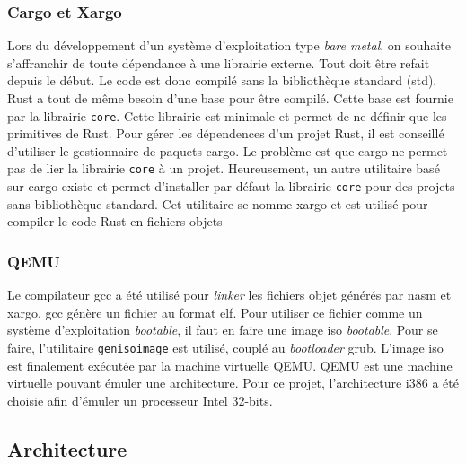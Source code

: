 \subsubsection{Cargo et Xargo}
Lors du développement d'un système d'exploitation type \textit{bare metal}, on souhaite
s'affranchir de toute dépendance à une librairie externe. Tout doit être refait depuis
le début. Le code est donc compilé sans la bibliothèque standard (std). Rust a tout
de même besoin d'une base pour être compilé. Cette base est fournie par la librairie
\texttt{core}. Cette librairie est minimale et permet de ne définir que
les primitives de Rust. Pour gérer les dépendences d'un projet Rust, il est conseillé
d'utiliser le gestionnaire de paquets cargo. Le problème est que cargo ne permet
pas de lier la librairie \texttt{core} à un projet. Heureusement, un 
autre utilitaire basé sur cargo existe et permet d'installer par défaut la librairie
\texttt{core} pour des projets sans bibliothèque standard. Cet utilitaire
se nomme xargo et est utilisé pour compiler le code Rust en fichiers objets \\

\subsubsection{QEMU}
\label{qemu}
Le compilateur \acrshort{gcc} a été utilisé pour \textit{linker} les fichiers
objet générés par nasm et xargo. \acrshort{gcc} génère un fichier au format \acrshort{elf}.
Pour utiliser ce fichier comme un système d'exploitation \textit{bootable}, il faut
en faire une image \acrshort{iso} \textit{bootable}. Pour se faire, l'utilitaire
\texttt{genisoimage} est utilisé, couplé au \textit{bootloader} \acrshort{grub}.
L'image \acrshort{iso} est finalement exécutée par la machine virtuelle QEMU.
QEMU est une machine virtuelle pouvant émuler une architecture. Pour ce projet,
l'architecture i386 a été choisie afin d'émuler un processeur Intel 32-bits.


\subsection{Architecture}